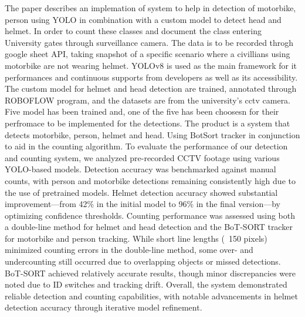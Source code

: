 The paper describes an implemation of system to help in detection of motorbike, person using YOLO in combination with a custom model to detect head and helmet. In order to count these classes and document the class entering University gates through surveillance camera. The data is to be recorded throgh google sheet API, taking snapshot of a specific scenario where a civillians using motorbike are not wearing helmet. YOLOv8 is used as the main framework for it performances and continuous supports from developers as well as its accessibility. The custom model for helmet and head detection are trained, annotated through ROBOFLOW program, and the datasets are from the university's cctv camera. Five model has been trained and, one of the five has been choosesn for their perfromace to be implemented for the detections. The product is a system that detects motorbike, person, helmet and head. Using BotSort tracker in conjunction to aid in the counting algorithm. To evaluate the performance of our detection and counting system, we analyzed pre-recorded CCTV footage using various YOLO-based models. Detection accuracy was benchmarked against manual counts, with person and motorbike detections remaining consistently high due to the use of pretrained models. Helmet detection accuracy showed substantial improvement—from 42\% in the initial model to 96\% in the final version—by optimizing confidence thresholds. Counting performance was assessed using both a double-line method for helmet and head detection and the BoT-SORT tracker for motorbike and person tracking. While short line lengths (~150 pixels) minimized counting errors in the double-line method, some over- and undercounting still occurred due to overlapping objects or missed detections. BoT-SORT achieved relatively accurate results, though minor discrepancies were noted due to ID switches and tracking drift. Overall, the system demonstrated reliable detection and counting capabilities, with notable advancements in helmet detection accuracy through iterative model refinement.